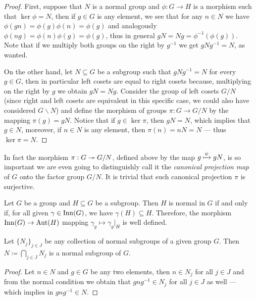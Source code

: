 \begin{proof}
First, suppose that \(N\) is a normal group and \(\phi: G \to H\) is a morphism
such that \(\ker \phi = N\), then if \(g \in G\) is any element, we see that for
any \(n \in N\) we have \(\phi(g n) = \phi(g) \phi(n) = \phi(g)\) and
analogously \(\phi(n g) = \phi(n) \phi(g) = \phi(g)\), thus in general \(g N = N
g = \phi^{-1}(\phi(g))\). Note that if we multiply both groups on the right by
\(g^{-1}\) we get \(g N g^{-1} = N\), as wanted.

On the other hand, let \(N \subseteq G\) be a subgroup such that \(g N g^{-1} =
N\) for every \(g \in G\), then in particular left cosets are equal to right
cosets because, multiplying on the right by \(g\) we obtain \(g N = N
g\). Consider the group of left cosets \(G/N\) (since right and left cosets are
equivalent in this specific case, we could also have considered \(G \backslash
N\)) and define the morphism of groups \(\pi: G \to G/N\) by the mapping
\(\pi(g) = g N\). Notice that if \(g \in \ker \pi\), then \(g N = N\), which
implies that \(g \in N\), moreover, if \(n \in N\) is any element, then
\(\pi(n) = n N = N\) --- thus \(\ker \pi = N\).
\end{proof}

In fact the morphism \(\pi: G \twoheadrightarrow G/N\), defined above by the map \(g \xmapsto
\psi g N\), is so important we are even going to distinguishly call it the
\emph{canonical projection map} of \(G\) onto the factor group \(G/N\). It is
trivial that such canonical projection \(\pi\) is surjective.

\begin{corollary}
\label{prop:normal-and-inner-automorphism-group}
Let \(G\) be a group and \(H \subseteq G\) be a subgroup. Then \(H\) is normal
in \(G\) if and only if, for all given \(\gamma \in \operatorname{Inn}(G)\), we have
\(\gamma(H) \subseteq H\). Therefore, the morphism \(\operatorname{Inn}(G) \to \operatorname{Aut}(H)\)
mapping \(\gamma_g \mapsto \gamma_g|_H\) is well defined.
\end{corollary}

\begin{corollary}
\label{cor:intersection-normal-subgroups}
Let \(\{N_{j}\}_{j \in J}\) be any collection of normal subgroups of a given
group \(G\). Then \(N \coloneq \bigcap_{j \in J} N_j\) is a normal subgroup of
\(G\).
\end{corollary}

\begin{proof}
Let \(n \in N\) and \(g \in G\) be any two elements, then \(n \in N_j\) for all
\(j \in J\) and from the normal condition we obtain that \(g n g^{-1} \in N_j\)
for all \(j \in J\) as well --- which implies in \(g n g^{-1} \in N\).
\end{proof}

